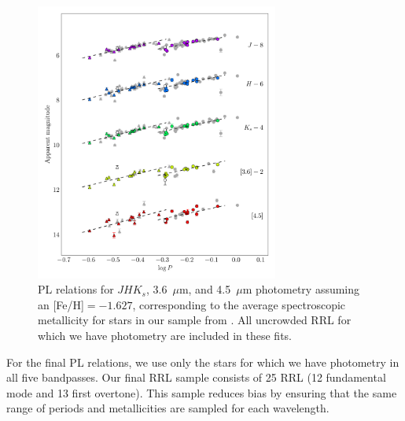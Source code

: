 \documentclass[a4paper,fleqn,usenatbib]{mnras}
\begin{document}
\begin{figure}
\begin{center}
\includegraphics[width=80mm]{reworked_fitting_code/final_plots/multiwavelength_PL_m4_clipped.pdf}
\caption{PL relations for $J\!H\!K_s$, 3.6~$\mu$m, and 4.5~$\mu$m photometry assuming an [Fe/H]$=-1.627$, corresponding to the average spectroscopic metallicity for stars in our sample from \citep{2006ApJ...640L..43S}. All uncrowded RRL for which we have photometry are included in these fits.}
\label{fig:omegaCen_pl_m4}
\end{center}
\end{figure}

For the final PL relations, we use only the stars for which we have photometry in all five bandpasses. Our final RRL sample consists of 25 RRL (12 fundamental mode and 13 first overtone). This sample reduces bias by ensuring that the same range of periods and metallicities are sampled for each wavelength.

\end{document}
